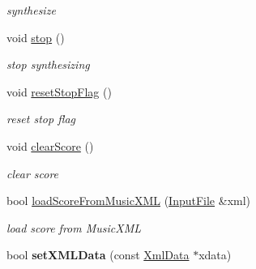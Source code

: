 \begin{DoxyCompactItemize}
\begin{DoxyCompactList}\small\item\em synthesize \end{DoxyCompactList}\item 
\hypertarget{classsinsy_1_1SinsyImpl_acd437b473026f2a15dbf628af6248095}{void \hyperlink{classsinsy_1_1SinsyImpl_acd437b473026f2a15dbf628af6248095}{stop} ()}\label{classsinsy_1_1SinsyImpl_acd437b473026f2a15dbf628af6248095}

\begin{DoxyCompactList}\small\item\em stop synthesizing \end{DoxyCompactList}\item 
\hypertarget{classsinsy_1_1SinsyImpl_a524a03c6557f90dce77bec865f12c97d}{void \hyperlink{classsinsy_1_1SinsyImpl_a524a03c6557f90dce77bec865f12c97d}{reset\-Stop\-Flag} ()}\label{classsinsy_1_1SinsyImpl_a524a03c6557f90dce77bec865f12c97d}

\begin{DoxyCompactList}\small\item\em reset stop flag \end{DoxyCompactList}\item 
\hypertarget{classsinsy_1_1SinsyImpl_a9aac96b24c7dfa8fa874da47cfd5ffac}{void \hyperlink{classsinsy_1_1SinsyImpl_a9aac96b24c7dfa8fa874da47cfd5ffac}{clear\-Score} ()}\label{classsinsy_1_1SinsyImpl_a9aac96b24c7dfa8fa874da47cfd5ffac}

\begin{DoxyCompactList}\small\item\em clear score \end{DoxyCompactList}\item 
\hypertarget{classsinsy_1_1SinsyImpl_ac1e56b876037a7709108cffe6a170ff3}{bool \hyperlink{classsinsy_1_1SinsyImpl_ac1e56b876037a7709108cffe6a170ff3}{load\-Score\-From\-Music\-X\-M\-L} (\hyperlink{classsinsy_1_1InputFile}{\-Input\-File} \&xml)}\label{classsinsy_1_1SinsyImpl_ac1e56b876037a7709108cffe6a170ff3}

\begin{DoxyCompactList}\small\item\em load score from \-Music\-X\-M\-L \end{DoxyCompactList}\item 
\hypertarget{classsinsy_1_1SinsyImpl_a2cae49dcd06ba100b788e2d28f0060c6}{bool {\bfseries set\-X\-M\-L\-Data} (const \hyperlink{classsinsy_1_1XmlData}{\-Xml\-Data} $\ast$xdata)}\label{classsinsy_1_1SinsyImpl_a2cae49dcd06ba100b788e2d28f0060c6}


\end{DoxyCompactItemize}
